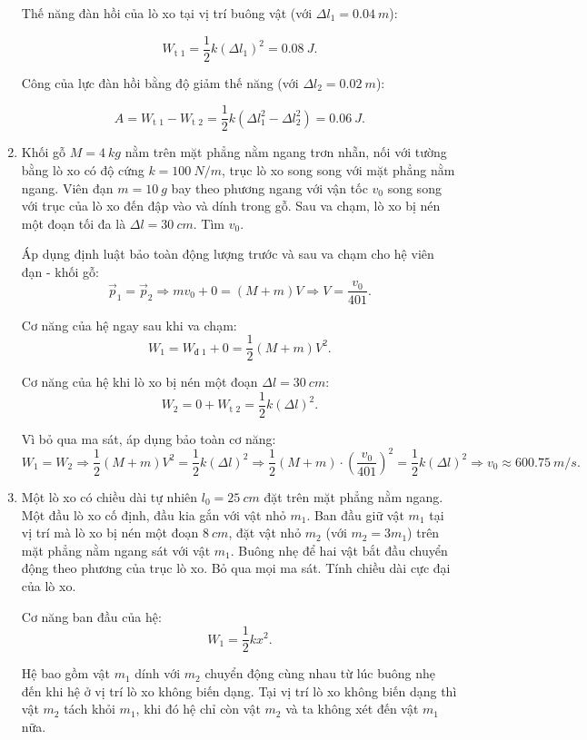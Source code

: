 \begin{enumerate}[label=\bfseries Câu \arabic*:]
	\hideall
	{	
			Thế năng đàn hồi của lò xo tại vị trí buông vật (với $\Delta l_1 = \SI{0.04}{m}$):
		
		$$W_\text{t 1} = \dfrac{1}{2}k(\Delta l_1)^2 = \SI{0.08}{J}.$$
		
		Công của lực đàn hồi bằng độ giảm thế năng (với $\Delta l_2 = \SI{0.02}{m}$):
		
		$$A=W_\text{t 1} - W_\text{t 2} =\dfrac{1}{2}k(\Delta l_1^2 - \Delta l_2^2) =\SI{0.06}{J}.$$
	}
	\item {}
	
	
	{
		Khối gỗ $M=\SI{4}{kg}$ nằm trên mặt phẳng nằm ngang trơn nhẵn, nối với tường bằng lò xo có độ cứng $k=\SI{100}{N/m}$, trục lò xo song song với mặt phẳng nằm ngang. Viên đạn $m=\SI{10}{g}$ bay theo phương ngang với vận tốc $v_0$ song song với trục của lò xo đến đập vào và dính trong gỗ. Sau va chạm, lò xo bị nén một đoạn tối đa là $\Delta l = \SI{30}{cm}$. Tìm $v_0$.	
	}
	
	\hideall
	{	
			Áp dụng định luật bảo toàn động lượng trước và sau va chạm cho hệ viên đạn - khối gỗ:
		$$\vec p_1 = \vec p_2 \Rightarrow mv_0 + 0 = (M+m)V \Rightarrow V = \dfrac{v_0}{401}.$$
		
		Cơ năng của hệ ngay sau khi va chạm:
		$$W_1 = W_\text{đ 1} + 0 = \dfrac{1}{2} (M+m)V^2.$$
		
		Cơ năng của hệ khi lò xo bị nén một đoạn $\Delta l = \SI{30}{cm}$:
		$$W_2 = 0 + W_\text{t 2} = \dfrac{1}{2} k (\Delta l)^2.$$
		
		Vì bỏ qua ma sát, áp dụng bảo toàn cơ năng:
		$$W_1 = W_2 \Rightarrow \dfrac{1}{2} (M+m)V^2 = \dfrac{1}{2} k (\Delta l)^2 \Rightarrow \dfrac{1}{2} (M+m) \cdot \left(\dfrac{v_0}{401}\right)^2 =  \dfrac{1}{2} k (\Delta l)^2 \Rightarrow v_0 \approx \SI{600.75}{m/s}.$$
	}
	\item {}
	
	
	{
		Một lò xo có chiều dài tự nhiên $l_0=\SI{25}{cm}$ đặt trên mặt phẳng nằm ngang. Một đầu lò xo cố định, đầu kia gắn với vật nhỏ $m_1$. Ban đầu giữ vật $m_1$ tại vị trí mà lò xo bị nén một đoạn $\SI{8}{cm}$, đặt vật nhỏ $m_2$ (với $m_2=3m_1$) trên mặt phẳng nằm ngang sát với vật $m_1$. Buông nhẹ để hai vật bắt đầu chuyển động theo phương của trục lò xo. Bỏ qua mọi ma sát. Tính chiều dài cực đại của lò xo.
	}
	
	\hideall
	{	
			Cơ năng ban đầu của hệ:
		$$W_1 = \dfrac{1}{2}kx^2.$$
		
		Hệ bao gồm vật $m_1$ dính với $m_2$ chuyển động cùng nhau từ lúc buông nhẹ đến khi hệ ở vị trí lò xo không biến dạng. Tại vị trí lò xo không biến dạng thì vật $m_2$ tách khỏi $m_1$, khi đó hệ chỉ còn vật $m_2$ và ta không xét đến vật $m_1$ nữa.
		
}
\end{enumerate}
